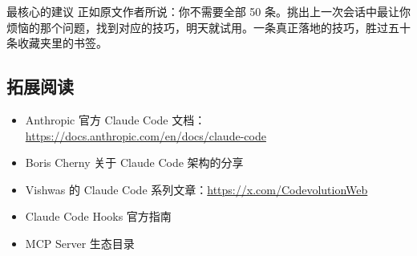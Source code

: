 \documentclass[a4paper]{article}
\begin{document}
\begin{importantbox}{最核心的建议}
正如原文作者所说：你不需要全部 50 条。挑出上一次会话中最让你烦恼的那个问题，找到对应的技巧，明天就试用。一条真正落地的技巧，胜过五十条收藏夹里的书签。
\end{importantbox}

\subsection{拓展阅读}

\begin{itemize}
  \item Anthropic 官方 Claude Code 文档：\url{https://docs.anthropic.com/en/docs/claude-code}
  \item Boris Cherny 关于 Claude Code 架构的分享
  \item Vishwas 的 Claude Code 系列文章：\url{https://x.com/CodevolutionWeb}
  \item Claude Code Hooks 官方指南
  \item MCP Server 生态目录
\end{itemize}

\end{document}
